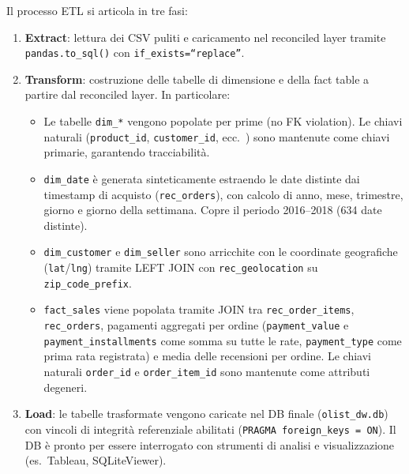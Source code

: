 \documentclass[12pt,a4paper]{article}
\begin{document}
Il processo ETL si articola in tre fasi:

\begin{enumerate}
  \item \textbf{Extract}: lettura dei CSV puliti e caricamento nel reconciled layer
        tramite \texttt{pandas.to\_sql()} con \texttt{if\_exists=``replace''}.

  \item \textbf{Transform}: costruzione delle tabelle di dimensione e della fact
        table a partire dal reconciled layer. In particolare:
        \begin{itemize}
          \item Le tabelle \texttt{dim\_*} vengono popolate per prime (no FK violation).
                Le chiavi naturali (\texttt{product\_id}, \texttt{customer\_id}, ecc.\
                ) sono mantenute come chiavi primarie, garantendo tracciabilità.
          \item \texttt{dim\_date} è generata sinteticamente estraendo le date distinte
                dai timestamp di acquisto (\texttt{rec\_orders}), con calcolo di anno,
                mese, trimestre, giorno e giorno della settimana. Copre il periodo
                2016--2018 (634 date distinte).
          \item \texttt{dim\_customer} e \texttt{dim\_seller} sono arricchite con le
                coordinate geografiche (\texttt{lat}/\texttt{lng}) tramite LEFT JOIN
                con \texttt{rec\_geolocation} su \texttt{zip\_code\_prefix}.
          \item \texttt{fact\_sales} viene popolata tramite JOIN tra
                \texttt{rec\_order\_items}, \texttt{rec\_orders}, pagamenti aggregati
                per ordine (\texttt{payment\_value} e \texttt{payment\_installments}
                come somma su tutte le rate, \texttt{payment\_type} come prima rata
                registrata) e media delle
                recensioni per ordine. Le chiavi naturali \texttt{order\_id} e
                \texttt{order\_item\_id} sono mantenute come attributi degeneri.
        \end{itemize}

  \item \textbf{Load}: le tabelle trasformate vengono caricate nel DB finale
        (\texttt{olist\_dw.db}) con vincoli di integrità referenziale abilitati
        (\texttt{PRAGMA foreign\_keys = ON}). Il DB è pronto per essere interrogato
        con strumenti di analisi e visualizzazione (es.\ Tableau, SQLiteViewer).
\end{enumerate}
\end{document}
